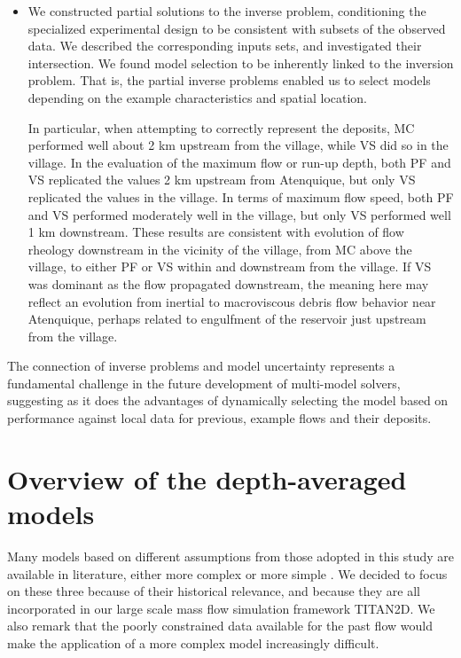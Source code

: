 \documentclass[nhess, manuscript]{copernicus}
\begin{document}
\begin{itemize}
  \item We constructed partial solutions to the inverse problem, conditioning the specialized experimental design to be consistent with subsets of the observed data. We  described the corresponding inputs sets, and investigated their intersection. We found model selection to be inherently linked to the inversion problem. That is, the partial inverse problems enabled us to select models depending on the example characteristics and spatial location.

      In particular, when attempting to correctly represent the deposits, MC performed well about 2 km upstream from the village, while VS did so in the village. In the evaluation of the maximum flow or run-up depth, both PF and VS replicated the values 2 km upstream from Atenquique, but only VS replicated the values in the village. In terms of maximum flow speed, both PF and VS performed moderately well in the village, but only VS performed well 1 km downstream.  These results are consistent with evolution of flow rheology downstream in the vicinity of the village, from MC above the village, to either PF or VS within and downstream from the village.  If VS was dominant as the flow propagated downstream, the meaning here may reflect an evolution from inertial to macroviscous debris flow behavior near Atenquique, perhaps related to engulfment of the reservoir just upstream from the village.
\end{itemize}
The connection of inverse problems and model uncertainty represents a fundamental challenge in the future development of multi-model solvers, suggesting as it does the advantages of dynamically selecting the model based on performance against local data for previous, example flows and their deposits.


\appendix
\section{Overview of the depth-averaged models}\label{A-1}
Many models based on different assumptions from those adopted in this study are available in literature, either more complex \citep{PitmanLe2005,Iverson2014} or more simple \citep{DadeHuppert1998}. We decided to focus on these three because of their historical relevance, and because they are all incorporated in our large scale mass flow simulation framework TITAN2D. We also remark that the poorly constrained data available for the past flow would make the application of a more complex model increasingly difficult.
\end{document}
